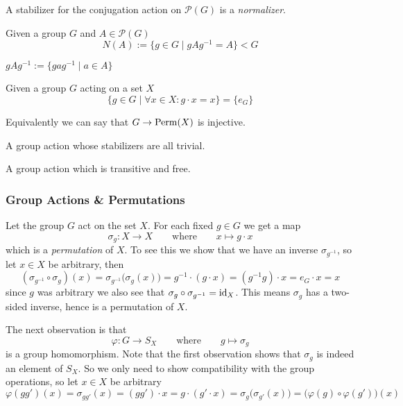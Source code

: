 A stabilizer for the conjugation action on \(\mathcal{P}(G)\) is a \emph{normalizer}.

\begin{definition}[Normalizer]
   Given a group \(G\) and \(A \in \mathcal{P}(G)\)
   \[N(A) := \{g \in G \mid gAg^{-1} = A\} < G\]
\end{definition}
\begin{remark}
   \(gAg^{-1} := \{gag^{-1} \mid a \in A\}\)
\end{remark}

\begin{definition}
   Given a group \(G\) acting on a set \(X\)
   \[\{g \in G \mid \forall x \in X: g \cdot x = x\} = \{e_G\}\]
\end{definition}
\begin{remark}
   Equivalently we can say that \(G \to \operatorname{Perm}(X)\) is injective.
\end{remark}

\begin{definition}
   A group action whose stabilizers are all trivial.
\end{definition}

\begin{definition}
   A group action which is transitive and free.
\end{definition}

\subsubsection{Group Actions \& Permutations}
Let the group \(G\) act on the set \(X\).
For each fixed \(g \in G\) we get a map
\[\sigma_g: X \to X \qquad\text{where}\qquad x \mapsto g \cdot x\]
which is a \emph{permutation} of \(X\).
To see this we show that we have an inverse \(\sigma_{g^{-1}}\), so let \(x \in X\) be arbitrary, then
\[(\sigma_{g^{-1}} \circ \sigma_g)(x) = \sigma_{g^{-1}}\big(\sigma_g(x)\big) = g^{-1} \cdot (g \cdot x) = (g^{-1}g) \cdot x = e_G \cdot x = x\]
since \(g\) was arbitrary we also see that \(\sigma_g \circ \sigma_{g^{-1}} = \operatorname{id}_X\).
This means \(\sigma_g\) has a two-sided inverse, hence is a permutation of \(X\).

The next observation is that
\[\varphi: G \to S_X \qquad\text{where}\qquad g \mapsto \sigma_g\]
is a group homomorphism.
Note that the first observation shows that \(\sigma_g\) is indeed an element of \(S_X\).
So we only need to show compatibility with the group operations, so let \(x \in X\) be arbitrary
\[\varphi(gg')(x) = \sigma_{gg'}(x) = (gg') \cdot x = g \cdot (g' \cdot x) = \sigma_g\big(\sigma_{g'}(x)\big) = \big(\varphi(g) \circ \varphi(g')\big)(x)\]

